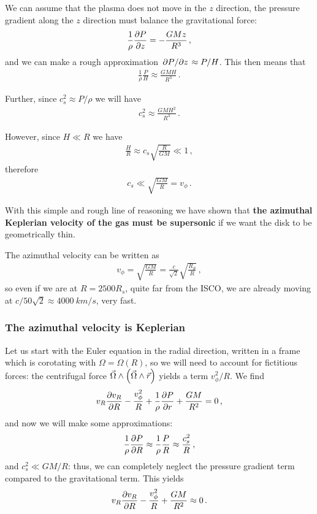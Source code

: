 \documentclass[main.tex]{subfiles}
\begin{document}
We can assume that the plasma does not move in the \(z\) direction, the pressure gradient along the \(z\) direction must balance the gravitational force: 
%
\begin{align}
\frac{1}{\rho } \pdv{P}{z} = - \frac{GMz}{R^3} 
\,,
\end{align}
%
and we can make a rough approximation \(\pdv*{P}{z} \approx P / H\). This then means that 
%
\begin{align}
\frac{1}{\rho } \frac{P}{H} \approx \frac{GMH}{R^3}
\,.
\end{align}

Further, since \(c_s^2 \approx P / \rho \) we will have 
%
\begin{align}
c_s^2 \approx \frac{GM H^2}{R^3}
\,.
\end{align}

However, since \(H \ll R\) we have 
%
\begin{align}
\frac{H}{R} \approx c_s \sqrt{ \frac{R}{GM}} \ll 1
\,,
\end{align}
%
therefore 
%
\begin{align}
c_s \ll \sqrt{ \frac{GM}{R}} = v_\phi 
\,.
\end{align}

With this simple and rough line of reasoning we have shown that \textbf{the azimuthal Keplerian velocity of the gas must be supersonic} if we want the disk to be geometrically thin.

The azimuthal velocity can be written as 
%
\begin{align}
v_\phi = \sqrt{ \frac{GM}{R}} = \frac{c}{\sqrt{2}} \sqrt{ \frac{R_S}{R}}
\,,
\end{align}
%
so even if we are at \(R = 2500 R_s\), quite far from the ISCO, we are already moving at \(c/ 50 \sqrt{2} \approx \SI{4000}{km/s}\), very fast. 

\subsubsection{The azimuthal velocity is Keplerian}

Let us start with the Euler equation in the radial direction, written in a frame which is corotating with \(\Omega = \Omega (R)\), so we will need to account for fictitious forces: the centrifugal force \(\vec{\Omega} \wedge \qty(\vec{\Omega} \wedge \vec{r})\) yields a term \(v_\phi^2 / R\).
We find 
%
\begin{align}
v_R \pdv{v_R}{R} - \frac{v_\phi^2}{R} + \frac{1}{\rho } \pdv{P}{r} + \frac{GM}{R^2} = 0
\,,
\end{align}
%
and now we will make some approximations: 
%
\begin{align}
\frac{1}{\rho } \pdv{P}{R} \approx \frac{1}{\rho } \frac{P}{R} \approx \frac{c_s^2}{R}
\,,
\end{align}
%
and \(c_s^2 \ll GM/R \): thus, we can completely neglect the pressure gradient term compared to the gravitational term. 
This yields 
%
\begin{align}
v_R \pdv{v_R}{R} - \frac{v_\phi^2}{R} + \frac{GM}{R^2} \approx 0
\,.
\end{align}
\end{document}
